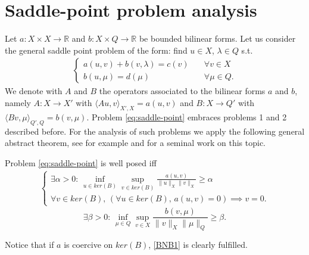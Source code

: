 \section{Saddle-point problem analysis}
Let $a: X \times X \rightarrow \mathbb{R}$ and $b: X\times Q \rightarrow \mathbb{R}$ be bounded bilinear forms. Let us consider the general saddle point problem of the form: find $u\in X$, $\lambda\in Q$ s.t.
\begin{eqnarray}\label{eq:saddle-point}
\begin{cases}
a(u,v)+b(v,\lambda)=c(v)\quad &\forall v\in X\\
b(u,\mu)=d(\mu) \quad &\forall \mu\in Q.
\end{cases}
\end{eqnarray}
We denote with $A$ and $B$ the operators associated to the bilinear forms $a$ and $b$, namely $A: X \longrightarrow X'$ with $\langle Au,v\rangle _{X',X} = a(u,v)$ and $B: X \longrightarrow Q'$ with $\langle Bv,\mu\rangle_{Q',Q} = b(v,\mu)$. Problem \eqref{eq:saddle-point} embraces problems 1 and 2 described before. 
For the analysis of such problems we apply the following general abstract theorem, see for example \cite[Theorem 2.34]{MR2050138} and \cite{MR365287} for a seminal work on this topic.
\begin{theorem}{}\label{th:bnb}
Problem \eqref{eq:saddle-point} is well posed iff 
\begin{eqnarray}\label{BNB1}
\begin{cases}
\exists \alpha >0 :\, \inf_{u\in ker(B)}\sup_{v\in ker(B)} \frac{a(u,v)}{\|u\|_{X}\|v\|_{X}}\geq \alpha\\
\forall v \in ker(B), \, \left( \forall u \in ker(B),\, a(u,v)=0 \right)\implies v=0.
\end{cases}
\end{eqnarray}
\begin{equation}\label{eq:infsup}
\exists \beta >0:\,\inf_{\mu\in Q}\sup_{v\in X} \frac{b(v,\mu)}{\|v\|_{X}\|\mu\|_{Q}}\geq \beta .
\end{equation}
\end{theorem} 
Notice that if $a$ is coercive on $ker(B)$, \eqref{BNB1} is clearly fulfilled. \\

